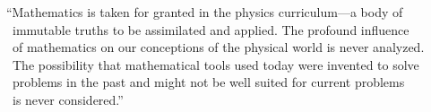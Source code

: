 \documentclass[preview]{standalone}
\begin{document}
\begin{justify}
``Mathematics is taken for granted in the physics curriculum—a body of \\ \
                        immutable truths to be assimilated and applied. The profound influence \\ \
                        of mathematics on our conceptions of the physical world is never analyzed. \\ \
                        The possibility that mathematical tools used today were invented to solve \\ \
                        problems in the past and might not be well suited for current problems \\ \
                        is never considered.''
\end{justify}
\end{document}
